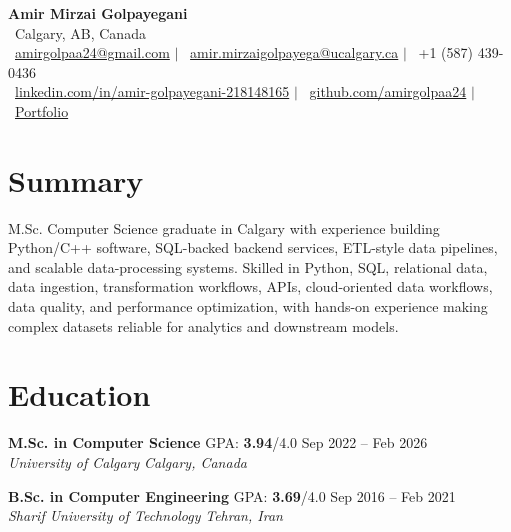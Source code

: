 \documentclass[a4paper,10pt]{article}
\newcommand{\resumeEducationSubheading}[5]{
    \textbf{#1} \hfill #2 \hfill #3 \\
    \textit{#4} \hfill \textit{#5}
}
\begin{document}

\begin{center}
    {\LARGE \textbf{Amir Mirzai Golpayegani}} \\[0.25em]
    \faMapMarker*~Calgary, AB, Canada \\[0.25em]
    \faEnvelope~\href{mailto:amirgolpaa24@gmail.com}{amirgolpaa24@gmail.com}
    $|$
    \faEnvelope~\href{mailto:amir.mirzaigolpayega@ucalgary.ca}{amir.mirzaigolpayega@ucalgary.ca}
    $|$
    \faPhone*~+1 (587) 439-0436 \\[0.25em]
    \faLinkedin~\href{https://linkedin.com/in/amir-golpayegani-218148165}{linkedin.com/in/amir-golpayegani-218148165}
    $|$
    \faGithub~\href{https://github.com/amirgolpaa24}{github.com/amirgolpaa24}
    $|$
    \faGlobe~\href{https://amir-portfolio-navy.vercel.app/}{Portfolio}
\end{center}


\section*{Summary}

M.Sc. Computer Science graduate in Calgary with experience building Python/C++ software, SQL-backed backend services, ETL-style data pipelines, and scalable data-processing systems. Skilled in Python, SQL, relational data, data ingestion, transformation workflows, APIs, cloud-oriented data workflows, data quality, and performance optimization, with hands-on experience making complex datasets reliable for analytics and downstream models.


\section*{Education}

\resumeEducationSubheading
{M.Sc. in Computer Science}
{GPA: \textbf{3.94}/4.0}
{Sep 2022 -- Feb 2026}
{University of Calgary}
{Calgary, Canada}

\vspace{0.35em}

\resumeEducationSubheading
{B.Sc. in Computer Engineering}
{GPA: \textbf{3.69}/4.0}
{Sep 2016 -- Feb 2021}
{Sharif University of Technology}
{Tehran, Iran}

\end{document}
